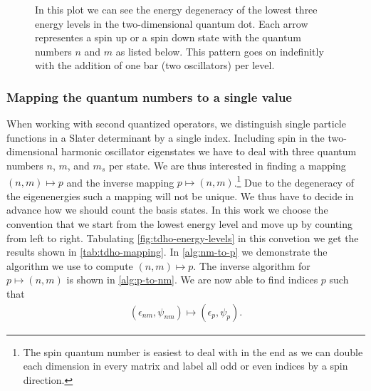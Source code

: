 \begin{figure}
\begin{center}
                \end{center}
                \caption{In this plot we can see the energy degeneracy of the lowest
                three energy levels in the two-dimensional quantum dot.
                Each arrow representes a spin up or a spin down state with the
                quantum numbers $n$ and $m$ as listed below.
                This pattern goes on indefinitly with the addition of one bar
                (two oscillators) per level.}
                \label{fig:tdho-energy-levels}
            \end{figure}


        \subsubsection{Mapping the quantum numbers to a single value}
            When working with second quantized operators, we distinguish single
            particle functions in a Slater determinant by a single index.
            Including spin in the two-dimensional harmonic oscillator
            eigenstates we have to deal with three quantum numbers $n$, $m$, and
            $m_s$ per state.
            We are thus interested in finding a mapping $(n, m) \mapsto p$ and
            the inverse mapping $p \mapsto (n, m)$.\footnote{%
                The spin quantum number is easiest to deal with in the end as we
                can double each dimension in every matrix and label all odd or
                even indices by a spin direction.
            }
            Due to the degeneracy of the eigenenergies such a mapping will not
            be unique.
            We thus have to decide in advance how we should count the basis
            states.
            In this work we choose the convention that we start from the
            lowest energy level and move up by counting from left to right.
            Tabulating \autoref{fig:tdho-energy-levels} in this convetion we get
            the results shown in \autoref{tab:tdho-mapping}.
            In \autoref{alg:nm-to-p} we demonstrate the algorithm we use to
            compute $(n, m) \mapsto p$.
            The inverse algorithm for $p \mapsto (n, m)$ is shown in
            \autoref{alg:p-to-nm}.
            We are now able to find indices $p$ such that
            \begin{align}
                (\epsilon_{nm}, \psi_{nm}) \mapsto (\epsilon_p, \psi_p).
            \end{align}

